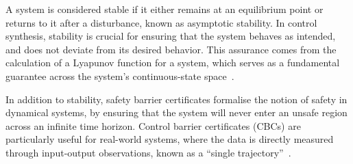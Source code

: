 \documentclass[sigconf]{acmart}
\begin{document}
A system is considered stable if it either remains at an equilibrium point or returns to it after a disturbance, known as asymptotic stability.
In control synthesis, stability is crucial for ensuring that the system behaves as intended, and does not deviate from its desired behavior.
This assurance comes from the calculation of a Lyapunov function for a system, which serves as a fundamental guarantee across the system's continuous-state space~\cite{breschi2021direct}.

In addition to stability, safety barrier certificates formalise the notion of safety in dynamical systems, by ensuring that the system will never enter an unsafe region across an infinite time horizon.
Control barrier certificates (CBCs) are particularly useful for real-world systems, where the data is directly measured through input-output observations, known as a ``single trajectory''~\cite{ren2024formal}.


\end{document}
